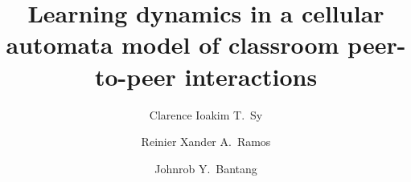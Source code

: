 \documentclass[10pt,a4paper,twoside]{article}
\begin{document}
\title{\TitleFont Learning dynamics in a cellular automata model of classroom peer-to-peer interactions}


\author[*\negthickspace]{Clarence Ioakim T.~Sy\authorsep}
\author[ ]{Reinier Xander A.~Ramos\authorsep}
\author[ ]{Johnrob Y.~Bantang\lastauthorsep}




\end{document}
